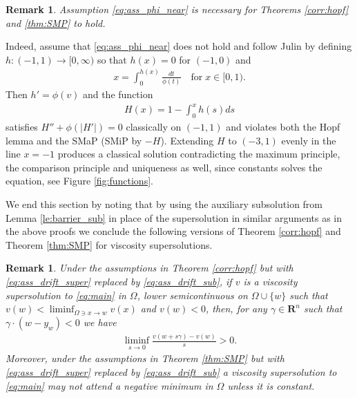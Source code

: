 \documentclass[12pt]{article}
\newtheorem{remark}[theorem]{Remark}
\newcommand{\blue}{\color{blau}}
\newcounter{komcounter}
\numberwithin{komcounter}{section}
\newcommand{\komM}[1]{{\bf \blue [\refstepcounter{komcounter}\thekomcounter (by M): #1]}}
\begin{document}

\begin{remark}\label{remark:counter1}
Assumption \eqref{eq:ass_phi_near} is necessary for Theorems \ref{corr:hopf} and \ref{thm:SMP} to hold.
\end{remark}
%
Indeed, assume that \eqref{eq:ass_phi_near} does not hold and
follow Julin \cite{J13} by defining $h : (-1, 1) \to [0, \infty)$ so that $h(x) = 0$ for $(-1, 0)$ and
%
\begin{align*}
x = \int_{0}^{h(x)} \frac{dt}{\phi(t)} \quad \text{for} \; x \in [0,1).
\end{align*}
%
Then $h' = \phi(v)$ and the function
%
\begin{align*}
H(x) = 1 - \int_{0}^{x} h(s) ds
\end{align*}
%
satisfies $H'' + \phi(|H'|) = 0$ classically on $(-1,1)$ and violates both the Hopf lemma and the SMaP
(SMiP by $-H$).
Extending $H$ to $(-3,1)$ evenly in the line $x = -1$ produces a classical solution contradicting the maximum principle, the comparison principle and uniqueness as well, since constants solves the equation, see Figure \ref{fig:functions}.

We end this section by noting that by using the auxiliary subsolution from Lemma \ref{le:barrier_sub} in place of the supersolution in similar arguments as in the above proofs we conclude the following versions of Theorem \ref{corr:hopf} and Theorem \ref{thm:SMP} for viscosity supersolutions.

\begin{remark}\label{re:remark-minimum principles}
Under the assumptions in Theorem \ref{corr:hopf} but with \eqref{eq:ass_drift_super} replaced by \eqref{eq:ass_drift_sub},
if $v$ is a viscosity supersolution to \eqref{eq:main} in $\Omega$, lower semicontinuous on $\Omega \cup \{w\}$ such that $v(w) < \liminf_{\Omega \ni x \to w} v(x)$ and $v(w) < 0$, %
then, for any $\gamma \in \mathbf R^n$ such that $ \gamma \cdot (w - y_w) < 0$ we have
%
\begin{align*}
\liminf_{s \to 0} \frac{v(w + s \gamma) - v(w)}{s} > 0.
\end{align*}
%
Moreover, under the assumptions in Theorem \ref{thm:SMP} but with \eqref{eq:ass_drift_super} replaced by \eqref{eq:ass_drift_sub}
a viscosity supersolution to \eqref{eq:main} may not attend a negative minimum in $\Omega$ unless it is constant.
\end{remark}
\end{document}
